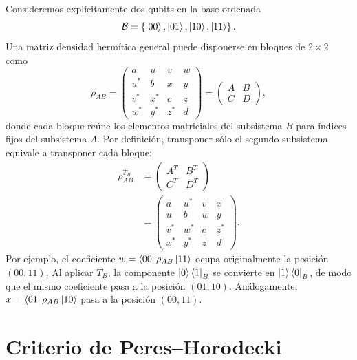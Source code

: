 \documentclass[../main.tex]{subfiles}
\begin{document}
Consideremos explícitamente dos qubits en la base ordenada
\begin{equation*}
    \mathcal{B}=\left\{\ket{00},\ket{01},\ket{10},\ket{11}\right\}.
\end{equation*}
Una matriz densidad hermítica general puede disponerse en bloques de $2\times 2$ como
\begin{equation*}
    \rho_{AB}
    =
    \left(
    \begin{array}{cc|cc}
        a      & u      & v      & w \\
        u^{*}  & b      & x      & y \\
        \hline
        v^{*}  & x^{*}  & c      & z \\
        w^{*}  & y^{*}  & z^{*}  & d
    \end{array}
    \right)
    =
    \begin{pmatrix}
        A & B\\
        C & D
    \end{pmatrix},
\end{equation*}
donde cada bloque reúne los elementos matriciales del subsistema $B$ para índices fijos del subsistema $A$. Por definición, transponer sólo el segundo subsistema equivale a transponer cada bloque:
\begin{align*}
    \rho_{AB}^{T_B}
    &=
    \begin{pmatrix}
        A^{T} & B^{T}\\
        C^{T} & D^{T}
    \end{pmatrix}\\[0.2cm]
    &=
    \left(
    \begin{array}{cc|cc}
        a      & u^{*}  & v      & x \\
        u      & b      & w      & y \\
        \hline
        v^{*}  & w^{*}  & c      & z^{*} \\
        x^{*}  & y^{*}  & z      & d
    \end{array}
    \right).
\end{align*}
Por ejemplo, el coeficiente $w=\bra{00}\rho_{AB}\ket{11}$ ocupa originalmente la posición $(00,11)$. Al aplicar $T_B$, la componente $\ket{0}\bra{1}_B$ se convierte en $\ket{1}\bra{0}_B$, de modo que el mismo coeficiente pasa a la posición $(01,10)$. Análogamente, $x=\bra{01}\rho_{AB}\ket{10}$ pasa a la posición $(00,11)$.

\section{Criterio de Peres--Horodecki}
\end{document}
